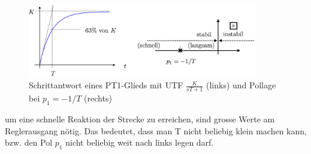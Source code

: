 	\begin{figure}[h!]	
		\begin{center}
			\includegraphics[width=10cm]{./images/PoleNullstellen.png}
		\end{center}
		\caption{Schrittantwort eines PT1-Glieds mit UTF $\frac{K}{sT + 1}$ (links) und Pollage bei $p_1 = -1/T$ (rechts)}
	\end{figure}
um eine schnelle Reaktion der Strecke
zu erreichen, sind grosse Werte am Reglerausgang nötig. Das bedeutet, dass man
T nicht beliebig klein machen kann, bzw. den Pol $p_1$ nicht beliebig weit nach links
legen darf.\\

